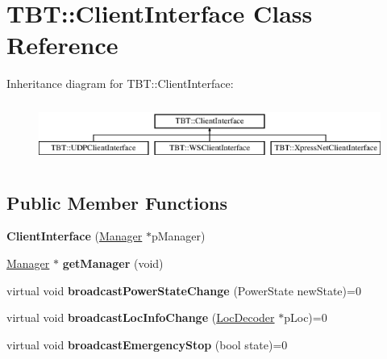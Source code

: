 \hypertarget{classTBT_1_1ClientInterface}{}\section{T\+BT\+:\+:Client\+Interface Class Reference}
\label{classTBT_1_1ClientInterface}
Inheritance diagram for T\+BT\+:\+:Client\+Interface\+:\begin{figure}[H]
\begin{center}
\leavevmode
\includegraphics[height=1.975309cm]{classTBT_1_1ClientInterface}
\end{center}
\end{figure}
\subsection*{Public Member Functions}
\begin{DoxyCompactItemize}
\item 
\mbox{\label{classTBT_1_1ClientInterface_a77cd35b080e78932f2371ea0f897964b}} 
{\bfseries Client\+Interface} (\hyperlink{classTBT_1_1Manager}{Manager} $\ast$p\+Manager)
\item 
\mbox{\label{classTBT_1_1ClientInterface_a26e144856b1253744b20c5638065acf7}} 
\hyperlink{classTBT_1_1Manager}{Manager} $\ast$ {\bfseries get\+Manager} (void)
\item 
\mbox{\label{classTBT_1_1ClientInterface_a1141311ac78db937084407bd210a626f}} 
virtual void {\bfseries broadcast\+Power\+State\+Change} (Power\+State new\+State)=0
\item 
\mbox{\label{classTBT_1_1ClientInterface_aaede3709fa0dcb23743f43d9c1a5ab04}} 
virtual void {\bfseries broadcast\+Loc\+Info\+Change} (\hyperlink{classTBT_1_1LocDecoder}{Loc\+Decoder} $\ast$p\+Loc)=0
\item 
\mbox{\label{classTBT_1_1ClientInterface_ad512f9bf22eb53bdc1c42f41bd597daf}} 
virtual void {\bfseries broadcast\+Emergency\+Stop} (bool state)=0
\end{DoxyCompactItemize}
